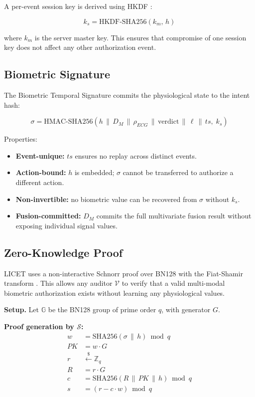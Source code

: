 \documentclass[12pt,a4paper]{article}
\begin{document}
A per-event session key is derived using HKDF \cite{krawczyk2010hkdf}:

\begin{equation}
k_s = \text{HKDF-SHA256}(k_m,\, h)
\end{equation}

where $k_m$ is the server master key. This ensures that compromise of one
session key does not affect any other authorization event.

\subsection{Biometric Signature}

The Biometric Temporal Signature commits the physiological state to the intent
hash:

\begin{equation}
\sigma = \text{HMAC-SHA256}\!\left(
  h \,\|\, D_M \,\|\, \rho_{ECG} \,\|\, \text{verdict} \,\|\, \ell \,\|\, ts,\;
  k_s\right)
\end{equation}

Properties:
\begin{itemize}
  \item \textbf{Event-unique:} $ts$ ensures no replay across distinct events.
  \item \textbf{Action-bound:} $h$ is embedded; $\sigma$ cannot be transferred
  to authorize a different action.
  \item \textbf{Non-invertible:} no biometric value can be recovered from
  $\sigma$ without $k_s$.
  \item \textbf{Fusion-committed:} $D_M$ commits the full multivariate fusion
  result without exposing individual signal values.
\end{itemize}

\subsection{Zero-Knowledge Proof}
\label{sec:zkp}

LICET uses a non-interactive Schnorr proof over BN128 with the Fiat-Shamir
transform \cite{fiat1987}. This allows any auditor $\mathcal{V}$ to verify
that a valid multi-modal biometric authorization exists without learning any
physiological values.

\textbf{Setup.} Let $\mathbb{G}$ be the BN128 group of prime order $q$, with
generator $G$.

\textbf{Proof generation by $\mathcal{S}$:}
\begin{align}
w   &= \text{SHA256}(\sigma \,\|\, h) \bmod q \\
PK  &= w \cdot G \\
r   &\stackrel{\$}{\leftarrow} \mathbb{Z}_q \\
R   &= r \cdot G \\
c   &= \text{SHA256}(R \,\|\, PK \,\|\, h) \bmod q \\
s   &= (r - c \cdot w) \bmod q
\end{align}
\end{document}
